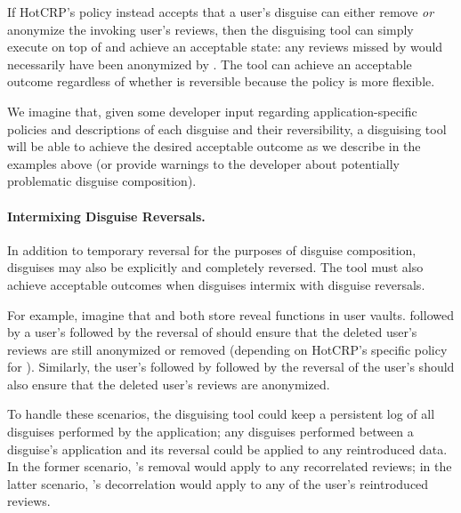 If HotCRP's policy instead accepts that a user's \gdpr disguise can either remove \emph{or}
anonymize the invoking user's reviews, then the disguising tool can simply execute \gdpr on top of
\ca and achieve an acceptable state: any reviews missed by \gdpr would necessarily have been
anonymized by \ca.  The tool can achieve an acceptable outcome regardless of whether \ca is
reversible because the policy is more flexible.

We imagine that, given some developer input regarding application-specific policies and descriptions
of each disguise and their reversibility, a disguising tool will be able to achieve the desired acceptable
outcome as we describe in the examples above (or provide warnings to the developer about potentially
problematic disguise composition).

\paragraph{Intermixing Disguise Reversals.}
In addition to temporary reversal for the purposes of disguise composition, disguises may also be
explicitly and completely reversed. The tool must also achieve acceptable outcomes when disguises
intermix with disguise reversals.

For example, imagine that \ca and \gdpr both store reveal functions in user vaults. 
%
\ca followed by a user's \gdpr followed by the reversal of \ca should ensure that the deleted user's
reviews are still anonymized or removed (depending on HotCRP's specific policy for \gdpr).
Similarly, the user's \gdpr followed by \ca followed by the reversal of the user's \gdpr should also
ensure that the deleted user's reviews are anonymized.

To handle these scenarios, the disguising tool could keep a persistent log of all disguises
performed by the application; any disguises performed between a disguise's application and its
reversal could be applied to any reintroduced data. In the former scenario, \gdpr's removal would
apply to any recorrelated reviews; in the latter scenario, \ca's decorrelation would apply to any of
the user's reintroduced reviews.
